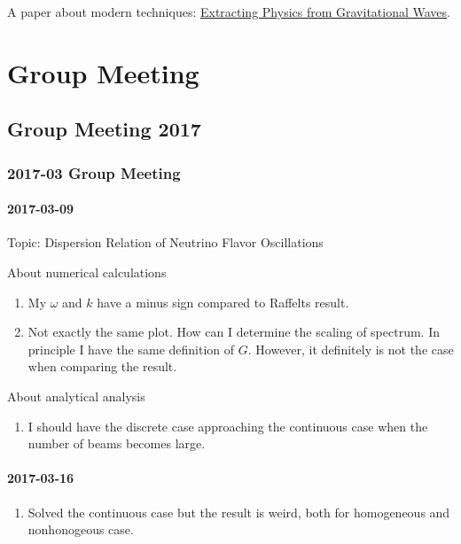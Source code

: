 \documentclass[letterpaper,12pt,english]{sphinxmanual}
\begin{document}
A paper about modern techniques: \href{http://www.nikhef.nl/pub/services/biblio/theses\_pdf/thesis\_T\_G\_F\_Li.pdf}{Extracting Physics from Gravitational Waves}.


\chapter{Group Meeting}
\label{\detokenize{group-meeting/index:group-meeting}}\label{\detokenize{group-meeting/index::doc}}

\section{Group Meeting 2017}
\label{\detokenize{group-meeting/2017/index:group-meeting-2017}}\label{\detokenize{group-meeting/2017/index::doc}}

\subsection{2017-03 Group Meeting}
\label{\detokenize{group-meeting/2017/2017-03:group-meeting}}\label{\detokenize{group-meeting/2017/2017-03::doc}}

\subsubsection{2017-03-09}
\label{\detokenize{group-meeting/2017/2017-03:id1}}
Topic: Dispersion Relation of Neutrino Flavor Oscillations

About numerical calculations
\begin{enumerate}
\item {} 
My \(\omega\) and \(k\) have a minus sign compared to Raffelts result.

\item {} 
Not exactly the same plot. How can I determine the scaling of spectrum. In principle I have the same definition of \(G\). However, it definitely is not the case when comparing the result.

\end{enumerate}

About analytical analysis
\begin{enumerate}
\item {} 
I should have the discrete case approaching the continuous case when the number of beams becomes large.

\end{enumerate}


\subsubsection{2017-03-16}
\label{\detokenize{group-meeting/2017/2017-03:id2}}\begin{enumerate}
\item {} 
Solved the continuous case but the result is weird, both for homogeneous and nonhonogeous case.

\end{enumerate}
\end{document}
